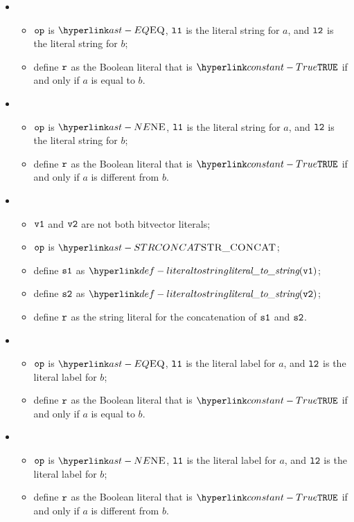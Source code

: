 \begin{itemize}
  \item {}
  \begin{itemize}
    \item $\texttt{op}$ is $\EQ$, $\texttt{l1}$ is the literal string for $a$, and $\texttt{l2}$ is the literal string for $b$;
    \item define $\texttt{r}$ as the Boolean literal that is $\True$ if and only if $a$ is equal to $b$.
  \end{itemize}

  \item {}
  \begin{itemize}
    \item $\texttt{op}$ is $\NE$, $\texttt{l1}$ is the literal string for $a$, and $\texttt{l2}$ is the literal string for $b$;
    \item define $\texttt{r}$ as the Boolean literal that is $\True$ if and only if $a$ is different from $b$.
  \end{itemize}

  \item {}
  \begin{itemize}
    \item $\texttt{v1}$ and $\texttt{v2}$ are not both bitvector literals;
    \item $\texttt{op}$ is $\STRCONCAT$;
    \item define $\texttt{s1}$ as $\literaltostring(\vvone)$;
    \item define $\texttt{s2}$ as $\literaltostring(\vvtwo)$;
    \item define $\texttt{r}$ as the string literal for the concatenation of $\texttt{s1}$ and $\texttt{s2}$.
  \end{itemize}

  \item {}
  \begin{itemize}
    \item $\texttt{op}$ is $\EQ$, $\texttt{l1}$ is the literal label for $a$, and $\texttt{l2}$ is the literal label for $b$;
    \item define $\texttt{r}$ as the Boolean literal that is $\True$ if and only if $a$ is equal to $b$.
  \end{itemize}

  \item {}
  \begin{itemize}
    \item $\texttt{op}$ is $\NE$, $\texttt{l1}$ is the literal label for $a$, and $\texttt{l2}$ is the literal label for $b$;
    \item define $\texttt{r}$ as the Boolean literal that is $\True$ if and only if $a$ is different from $b$.
  \end{itemize}

\end{itemize}

